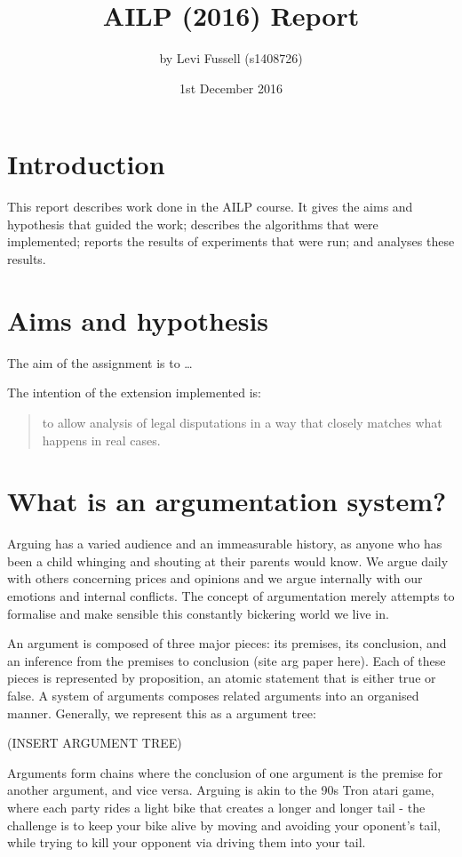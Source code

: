 \documentclass[10pt,a4paper,twocolumn]{article}
\title{AILP (2016) Report}               %
\author{by Levi Fussell (s1408726)}
\date{1st December 2016}                 %
\begin{document}
\maketitle  %
%
\section{Introduction}

This report describes work done in the AILP
course.  It gives the aims and hypothesis that guided the work;
describes the algorithms that were implemented;  reports the results
of experiments that were run;  and analyses these results.

\section{Aims and hypothesis}

The aim of the assignment is to \dots

The intention of the extension implemented is:
\begin{quote}
   to allow analysis of legal disputations in a way that closely matches
   what happens in real cases.
\end{quote}

\section{What is an argumentation system?}

Arguing has a varied audience and an immeasurable history, as anyone who has
been a child whinging and shouting at their parents would know. We argue daily
with others concerning prices and opinions and we argue internally with our
emotions and internal conflicts. The concept of argumentation merely attempts to
formalise and make sensible this constantly bickering world we live in.

An argument is composed of three major pieces: its premises, its conclusion,
and an inference from the premises to conclusion (site arg paper here). Each of
these pieces is represented by proposition, an atomic statement that is either
true or false. A system of arguments composes related arguments into an
organised manner. Generally, we represent this as a argument tree:

(INSERT ARGUMENT TREE)

Arguments form chains where the conclusion of one argument is the premise for
another argument, and vice versa. Arguing is akin to the  90s Tron atari game,
where each party rides a light bike that creates a longer and longer tail - the
challenge is to keep your bike alive by moving and avoiding your oponent's tail, while
trying to kill your opponent via driving them into your tail.
\end{document}
